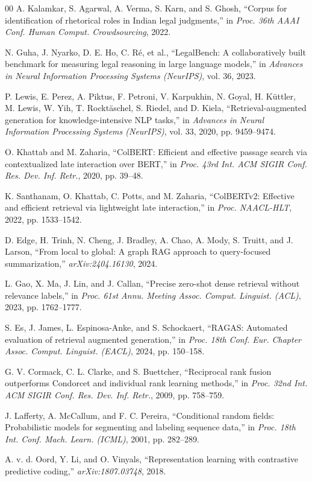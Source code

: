 \documentclass[conference]{IEEEtran}
\begin{document}
\begin{thebibliography}{00}
A. Kalamkar, S. Agarwal, A. Verma, S. Karn, and S. Ghosh, ``Corpus for identification of rhetorical roles in Indian legal judgments,'' in \textit{Proc. 36th AAAI Conf. Human Comput. Crowdsourcing}, 2022.

N. Guha, J. Nyarko, D. E. Ho, C. R{\'e}, et al., ``LegalBench: A collaboratively built benchmark for measuring legal reasoning in large language models,'' in \textit{Advances in Neural Information Processing Systems (NeurIPS)}, vol. 36, 2023.

P. Lewis, E. Perez, A. Piktus, F. Petroni, V. Karpukhin, N. Goyal, H. K{\"u}ttler, M. Lewis, W. Yih, T. Rockt{\"a}schel, S. Riedel, and D. Kiela, ``Retrieval-augmented generation for knowledge-intensive NLP tasks,'' in \textit{Advances in Neural Information Processing Systems (NeurIPS)}, vol. 33, 2020, pp. 9459--9474.

O. Khattab and M. Zaharia, ``ColBERT: Efficient and effective passage search via contextualized late interaction over BERT,'' in \textit{Proc. 43rd Int. ACM SIGIR Conf. Res. Dev. Inf. Retr.}, 2020, pp. 39--48.

K. Santhanam, O. Khattab, C. Potts, and M. Zaharia, ``ColBERTv2: Effective and efficient retrieval via lightweight late interaction,'' in \textit{Proc. NAACL-HLT}, 2022, pp. 1533--1542.

D. Edge, H. Trinh, N. Cheng, J. Bradley, A. Chao, A. Mody, S. Truitt, and J. Larson, ``From local to global: A graph RAG approach to query-focused summarization,'' \textit{arXiv:2404.16130}, 2024.

L. Gao, X. Ma, J. Lin, and J. Callan, ``Precise zero-shot dense retrieval without relevance labels,'' in \textit{Proc. 61st Annu. Meeting Assoc. Comput. Linguist. (ACL)}, 2023, pp. 1762--1777.

S. Es, J. James, L. Espinosa-Anke, and S. Schockaert, ``RAGAS: Automated evaluation of retrieval augmented generation,'' in \textit{Proc. 18th Conf. Eur. Chapter Assoc. Comput. Linguist. (EACL)}, 2024, pp. 150--158.

G. V. Cormack, C. L. Clarke, and S. Buettcher, ``Reciprocal rank fusion outperforms Condorcet and individual rank learning methods,'' in \textit{Proc. 32nd Int. ACM SIGIR Conf. Res. Dev. Inf. Retr.}, 2009, pp. 758--759.

J. Lafferty, A. McCallum, and F. C. Pereira, ``Conditional random fields: Probabilistic models for segmenting and labeling sequence data,'' in \textit{Proc. 18th Int. Conf. Mach. Learn. (ICML)}, 2001, pp. 282--289.

A. v. d. Oord, Y. Li, and O. Vinyals, ``Representation learning with contrastive predictive coding,'' \textit{arXiv:1807.03748}, 2018.

\end{thebibliography}
\end{document}
